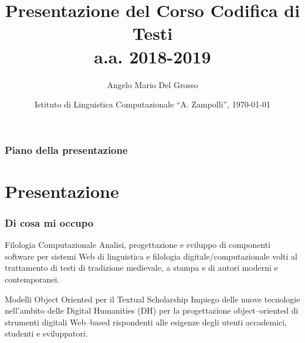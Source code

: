 \documentclass{beamer}
\title{Presentazione del Corso Codifica di Testi \\a.a. 2018-2019}
\author[A.M. Del Grosso]{Angelo Mario Del Grosso}
\institute{\texttt{angelo.delgrosso@ilc.cnr.it} \\\bigskip\textit{CNR-ILC-LicoLab}}
\date{Istituto di Linguistica Computazionale ``A. Zampolli'', \today}
\begin{document}
\begin{frame}
	\maketitle
\end{frame}

\begin{frame}
	\frametitle{Piano della presentazione}
	\tableofcontents
\end{frame}

\section{Presentazione}

\begin{frame}
	\frametitle{Di cosa mi occupo}
	\addtocounter{nframe}{1}

	\begin{block}{Filologia Computazionale}
		Analisi, progettazione e sviluppo di componenti software per sistemi Web di linguistica e filologia digitale/computazionale volti al trattamento di testi di tradizione medievale, a stampa e di autori moderni e contemporanei.
	\end{block}

	\begin{block}{Modelli Object Oriented per il Textual Scholarship}
		Impiego delle nuove tecnologie nell’ambito delle Digital Humanities (DH) per la progettazione
		object–oriented di strumenti digitali Web–based rispondenti alle esigenze degli utenti accademici, studenti e sviluppatori.
	\end{block}




\end{frame}
\end{document}
